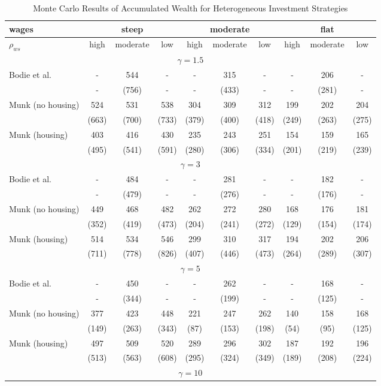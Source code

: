 \begin{table}[h!]
	\centering
	\caption{Monte Carlo Results of Accumulated Wealth for Heterogeneous Investment Strategies}
	\label{table:wealthhet}
	\begin{tabular}[c]{|l|ccc|ccc|ccc|}
		\hline
		 wages& \multicolumn{3}{c|}{steep} & \multicolumn{3}{c|}{moderate} & \multicolumn{3}{c|}{flat}\\
		\hline
		$\rho_{ws}$&high&moderate&low&high&moderate&low&high&moderate&low\\
		\hline
	\multicolumn{10}{|c|}{$\gamma=1.5$}\\
		\hline
Bodie et al.			 	&-&  544  &-&-&   315&-&-&  206&-\\  
							&-&  (756)&-&-& (433)&-&-& (281)&-\\
Munk (no housing)			&  524  &  531&   538&  304&  309&  312&  199&  202&  204\\
							&  (663)&  (700)&  (733)&  (379)&  (400)&  (418)&  (249)&  (263)&  (275)\\
Munk (housing)				&  403  &  416&  430&  235&  243&  251&  154&  159&  165\\
							&  (495)&  (541)&  (591)&  (280)&  (306)&  (334)&  (201)&  (219)&  (239)\\
	\hline
	\multicolumn{10}{|c|}{$\gamma=3$}\\
	\hline
Bodie et al.			 	&-&  484  &-&-&281  &-&-& 182&-\\
							&-&  (479)&-&-&(276)&-&-& (176)&-\\
Munk (no housing)			&  449&  468&  482&  262&  272&  280&  168&  176&  181\\
							&  (352)&  (419)&  (473)&  (204)&  (241)&  (272)&  (129)&  (154)&  (174)\\
Munk (housing)				&  514&  534&  546&  299&  310&  317&  194&  202&  206\\
							&  (711)&  (778)&  (826)&  (407)&  (446)&  (473)&  (264)&  (289)&  (307)\\
	\hline
	\multicolumn{10}{|c|}{$\gamma=5$}\\

		\hline
Bodie et al.			 	&-& 450&-&-& 262&-&-& 168&-\\
							&-& (344)&-&-& (199)&-&-& (125)&-\\
Munk (no housing)			&  377&  423&  448&  221&  247&  262&  140&  158&  168\\
							&  (149)&  (263)&  (343)&  (87)&  (153)&  (198)&  (54)&  (95)&  (125)\\
Munk (housing)				&  497&  509&  520&  289&  296&  302&  187&  192&  196\\
							&  (513)&  (563)&  (608)&  (295)&  (324)&  (349)&  (189)&  (208)&  (224)\\
	\hline
	\multicolumn{10}{|c|}{$\gamma=10$}\\


\end{tabular}
\end{table}

